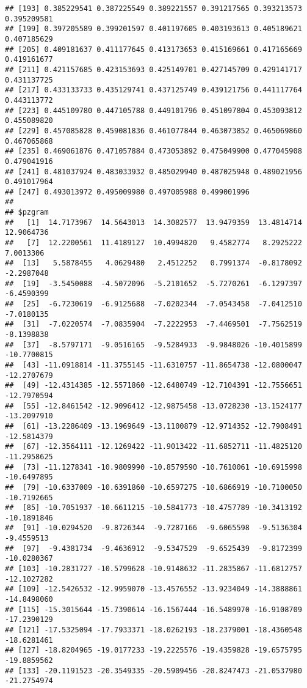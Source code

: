 \documentclass[
]{article}
\begin{document}
\begin{verbatim}
## [193] 0.385229541 0.387225549 0.389221557 0.391217565 0.393213573 0.395209581
## [199] 0.397205589 0.399201597 0.401197605 0.403193613 0.405189621 0.407185629
## [205] 0.409181637 0.411177645 0.413173653 0.415169661 0.417165669 0.419161677
## [211] 0.421157685 0.423153693 0.425149701 0.427145709 0.429141717 0.431137725
## [217] 0.433133733 0.435129741 0.437125749 0.439121756 0.441117764 0.443113772
## [223] 0.445109780 0.447105788 0.449101796 0.451097804 0.453093812 0.455089820
## [229] 0.457085828 0.459081836 0.461077844 0.463073852 0.465069860 0.467065868
## [235] 0.469061876 0.471057884 0.473053892 0.475049900 0.477045908 0.479041916
## [241] 0.481037924 0.483033932 0.485029940 0.487025948 0.489021956 0.491017964
## [247] 0.493013972 0.495009980 0.497005988 0.499001996
## 
## $pzgram
##   [1]  14.7173967  14.5643013  14.3082577  13.9479359  13.4814714  12.9064736
##   [7]  12.2200561  11.4189127  10.4994820   9.4582774   8.2925222   7.0013306
##  [13]   5.5878455   4.0629480   2.4512252   0.7991374  -0.8178092  -2.2987048
##  [19]  -3.5450088  -4.5072096  -5.2101652  -5.7270261  -6.1297397  -6.4590399
##  [25]  -6.7230619  -6.9125688  -7.0202344  -7.0543458  -7.0412510  -7.0180135
##  [31]  -7.0220574  -7.0835904  -7.2222953  -7.4469501  -7.7562519  -8.1398838
##  [37]  -8.5797171  -9.0516165  -9.5284933  -9.9848026 -10.4015899 -10.7700815
##  [43] -11.0918814 -11.3755145 -11.6310757 -11.8654738 -12.0800047 -12.2707679
##  [49] -12.4314385 -12.5571860 -12.6480749 -12.7104391 -12.7556651 -12.7970594
##  [55] -12.8461542 -12.9096412 -12.9875458 -13.0728230 -13.1524177 -13.2097910
##  [61] -13.2286409 -13.1969649 -13.1100879 -12.9714352 -12.7908491 -12.5814379
##  [67] -12.3564111 -12.1269422 -11.9013422 -11.6852711 -11.4825120 -11.2958625
##  [73] -11.1278341 -10.9809990 -10.8579590 -10.7610061 -10.6915998 -10.6497895
##  [79] -10.6337009 -10.6391860 -10.6597275 -10.6866919 -10.7100050 -10.7192665
##  [85] -10.7051937 -10.6611215 -10.5841773 -10.4757789 -10.3413192 -10.1891846
##  [91] -10.0294520  -9.8726344  -9.7287166  -9.6065598  -9.5136304  -9.4559513
##  [97]  -9.4381734  -9.4636912  -9.5347529  -9.6525439  -9.8172399 -10.0280367
## [103] -10.2831727 -10.5799628 -10.9148632 -11.2835867 -11.6812757 -12.1027282
## [109] -12.5426532 -12.9959070 -13.4576552 -13.9234049 -14.3888861 -14.8498060
## [115] -15.3015644 -15.7390614 -16.1567444 -16.5489970 -16.9108709 -17.2390129
## [121] -17.5325094 -17.7933371 -18.0262193 -18.2379001 -18.4360548 -18.6281461
## [127] -18.8204965 -19.0177233 -19.2225576 -19.4359828 -19.6575795 -19.8859562
## [133] -20.1191523 -20.3549335 -20.5909456 -20.8247473 -21.0537980 -21.2754974

\end{verbatim}
\end{document}
